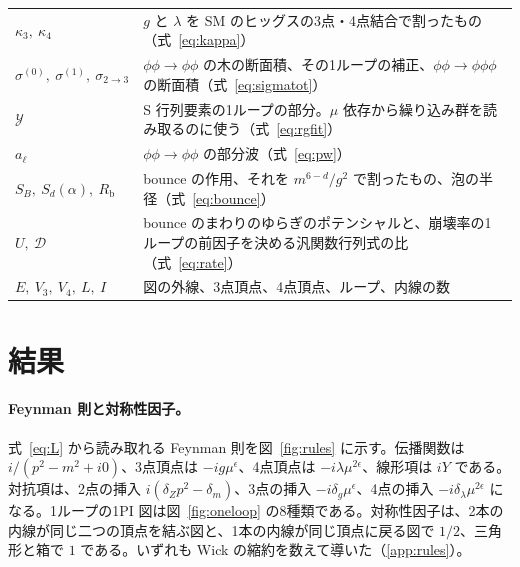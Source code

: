 \documentclass[a4paper,10pt]{ltjsarticle}
\begin{document}
\begin{table}[tbp]
\begin{tabularx}{\linewidth}{>{\raggedright\arraybackslash}p{3.3cm}X}
$\kappa_3,\ \kappa_4$ & $g$ と $\lambda$ を SM のヒッグスの3点・4点結合で割ったもの（式~\eqref{eq:kappa}） \\
$\sigma^{(0)},\ \sigma^{(1)},\ \sigma_{2\to3}$ & $\phi\phi\to\phi\phi$ の木の断面積、その1ループの補正、$\phi\phi\to\phi\phi\phi$ の断面積（式~\eqref{eq:sigmatot}） \\
$\mathcal{Y}$ & S 行列要素の1ループの部分。$\mu$ 依存から繰り込み群を読み取るのに使う（式~\eqref{eq:rgfit}） \\
$a_\ell$ & $\phi\phi\to\phi\phi$ の部分波（式~\eqref{eq:pw}） \\
$S_B,\ S_d(\alpha),\ R_{\mathrm b}$ & bounce の作用、それを $m^{6-d}/g^2$ で割ったもの、泡の半径（式~\eqref{eq:bounce}） \\
$U,\ \mathcal D$ & bounce のまわりのゆらぎのポテンシャルと、崩壊率の1ループの前因子を決める汎関数行列式の比（式~\eqref{eq:rate}） \\
$E,\ V_3,\ V_4,\ L,\ I$ & 図の外線、3点頂点、4点頂点、ループ、内線の数 \\
\bottomrule
\end{tabularx}
\end{table}

\section{結果}\label{sec:results}

\paragraph{Feynman 則と対称性因子。}式~\eqref{eq:L} から読み取れる Feynman 則を図~\ref{fig:rules} に示す。伝播関数は $i/(p^2-m^2+i0)$、3点頂点は $-ig\mu^\epsilon$、4点頂点は $-i\lambda\mu^{2\epsilon}$、線形項は $iY$ である。対抗項は、2点の挿入 $i(\delta_Zp^2-\delta_m)$、3点の挿入 $-i\delta_g\mu^\epsilon$、4点の挿入 $-i\delta_\lambda\mu^{2\epsilon}$ になる。1ループの1PI 図は図~\ref{fig:oneloop} の8種類である。対称性因子は、2本の内線が同じ二つの頂点を結ぶ図と、1本の内線が同じ頂点に戻る図で $1/2$、三角形と箱で $1$ である。いずれも Wick の縮約を数えて導いた（\ref{app:rules}）。
\end{document}
